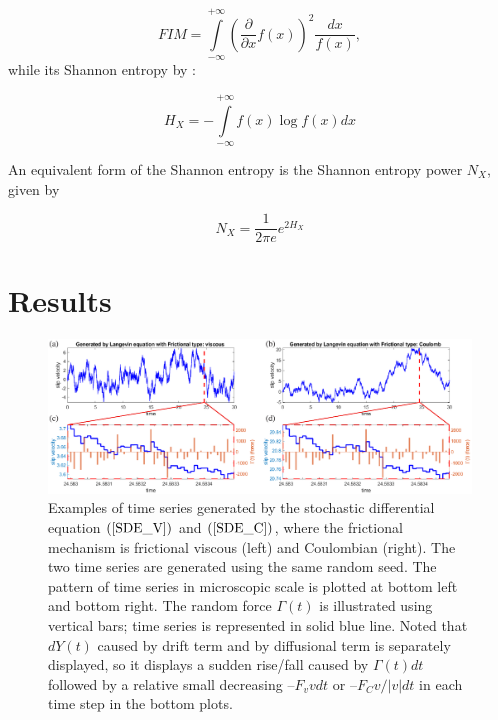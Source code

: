 \documentclass[%
 aip,
rsi,%
 amsmath,amssymb,
 reprint,%
]{revtex4-1}
\begin{document}
\begin{equation}
    FIM=\int\limits_{-\infty}^{+\infty}(\frac{\partial}{\partial x}f(x))^2\frac{dx}{f(x)}\label{FIM},
\end{equation}
while its Shannon entropy by \cite{fisher_theory_1925}:

\begin{equation}
    H_X=-\int\limits_{-\infty}^{+\infty}f(x)\log f(x) dx \label{HX}
\end{equation}

An equivalent form of the Shannon entropy is the Shannon entropy power $N_X$, given by

\begin{equation}
    N_X=\frac{1}{2\pi e}e^{2H_X} \label{NX}
\end{equation}

\section{Results}

\begin{figure}%
    \includegraphics[width=\textwidth]{Fig_series.eps}
    \caption{\label{f_wide}  Examples of time series generated by the stochastic differential equation $(\ref{SDE_V})$ and $(\ref{SDE_C})$, where the frictional  mechanism is frictional viscous (left) and Coulombian (right). The two time series are generated using the same random seed. The pattern of time series in microscopic scale is plotted at bottom left and bottom right. The random force $\Gamma (t)$ is illustrated using vertical bars; time series is represented in solid blue line. Noted that $dY(t)$ caused by drift term and by diffusional term is separately displayed, so it displays a sudden rise/fall caused by $\Gamma (t)dt$ followed by a relative small decreasing $–F_v vdt$ or $–F_C v/|v|dt$ in each time step in the bottom plots. }
\end{figure}
\end{document}
